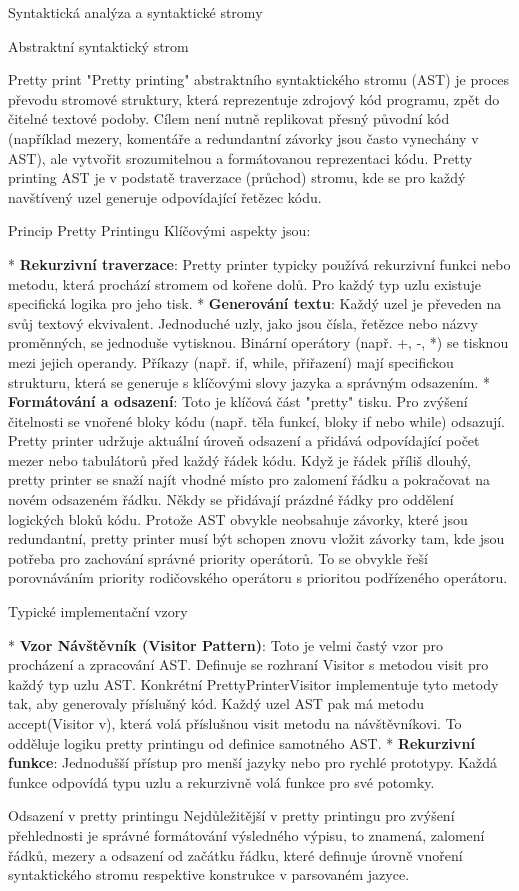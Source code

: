 \chap Syntaktická analýza a syntaktické stromy


\sec Abstraktní syntaktický strom

\sec Pretty print
"Pretty printing" abstraktního syntaktického stromu (AST) je proces převodu stromové struktury, která reprezentuje zdrojový kód programu, zpět do čitelné textové podoby. Cílem není nutně replikovat přesný původní kód (například mezery, komentáře a redundantní závorky jsou často vynechány v AST), ale vytvořit srozumitelnou a formátovanou reprezentaci kódu. Pretty printing AST je v podstatě traverzace (průchod) stromu, kde se pro každý navštívený uzel generuje odpovídající řetězec kódu. 

\secc Princip Pretty Printingu
Klíčovými aspekty jsou:

\begitems
* {\bf Rekurzivní traverzace}: Pretty printer typicky používá rekurzivní funkci nebo metodu, která prochází stromem od kořene dolů. Pro každý typ uzlu existuje specifická logika pro jeho tisk.
* {\bf Generování textu}: Každý uzel je převeden na svůj textový ekvivalent. Jednoduché uzly, jako jsou čísla, řetězce nebo názvy proměnných, se jednoduše vytisknou. Binární operátory (např. +, -, *) se tisknou mezi jejich operandy. Příkazy (např. if, while, přiřazení) mají specifickou strukturu, která se generuje s klíčovými slovy jazyka a správným odsazením.
* {\bf Formátování a odsazení}: Toto je klíčová část "pretty" tisku. Pro zvýšení čitelnosti se vnořené bloky kódu (např. těla funkcí, bloky if nebo while) odsazují. Pretty printer udržuje aktuální úroveň odsazení a přidává odpovídající počet mezer nebo tabulátorů před každý řádek kódu. Když je řádek příliš dlouhý, pretty printer se snaží najít vhodné místo pro zalomení řádku a pokračovat na novém odsazeném řádku. Někdy se přidávají prázdné řádky pro oddělení logických bloků kódu. Protože AST obvykle neobsahuje závorky, které jsou redundantní, pretty printer musí být schopen znovu vložit závorky tam, kde jsou potřeba pro zachování správné priority operátorů. To se obvykle řeší porovnáváním priority rodičovského operátoru s prioritou podřízeného operátoru.
\enditems

\secc Typické implementační vzory

\begitems
* {\bf Vzor Návštěvník (Visitor Pattern)}: Toto je velmi častý vzor pro procházení a zpracování AST. Definuje se rozhraní Visitor s metodou visit pro každý typ uzlu AST. Konkrétní PrettyPrinterVisitor implementuje tyto metody tak, aby generovaly příslušný kód. Každý uzel AST pak má metodu accept(Visitor v), která volá příslušnou visit metodu na návštěvníkovi. To odděluje logiku pretty printingu od definice samotného AST.
* {\bf Rekurzivní funkce}: Jednodušší přístup pro menší jazyky nebo pro rychlé prototypy. Každá funkce odpovídá typu uzlu a rekurzivně volá funkce pro své potomky.
\enditems

\secc Odsazení v pretty printingu
Nejdůležitější v pretty printingu pro zvýšení přehlednosti je správné formátování výsledného výpisu, to znamená, zalomení řádků, mezery a odsazení od začátku řádku, které definuje úrovně vnoření syntaktického stromu respektive konstrukce v parsovaném jazyce.



